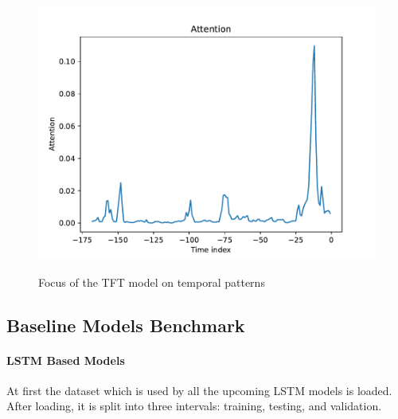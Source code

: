 \documentclass[a4paper]{article}
\begin{document}
    \begin{figure}
\centering
{\includegraphics[keepaspectratio]{"./src/attention.pdf"}}
\caption{Focus of the TFT model on temporal patterns}
\end{figure}

    \subsection{Baseline Models
Benchmark}\label{baseline-models-benchmark}

    \paragraph{LSTM Based Models}\label{lstm-based-models}

    At first the dataset which is used by all the upcoming LSTM models is
loaded. After loading, it is split into three intervals: training,
testing, and validation.
\end{document}
